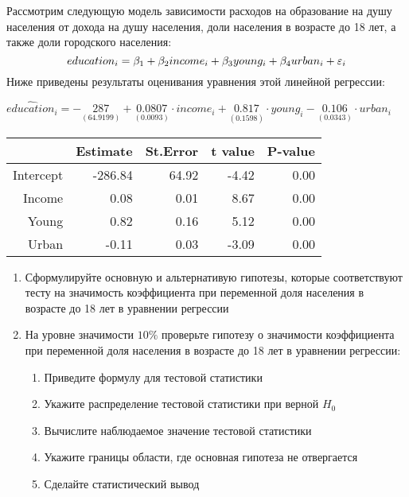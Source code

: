 \documentclass[pdftex,11pt,openany]{book}\usepackage[]{graphicx}\usepackage[]{color}
\begin{document}
\begin{problem}
 Рассмотрим следующую модель зависимости расходов на образование на душу населения от дохода на душу населения, доли населения в возрасте до 18 лет, а также доли городского населения: 
\[
education_i = \beta_1 + \beta_2 income_i + \beta_3 young_i + \beta_4 urban_i + \varepsilon_i
\]
Ниже приведены результаты оценивания уравнения этой линейной регрессии:
\begin{center}
\ensuremath{\widehat{education}_i=-\underset{(64.9199)}{287}+\underset{( 0.0093)}{0.0807}\cdot income_i+\underset{( 0.1598)}{0.817}\cdot young_i-\underset{( 0.0343)}{0.106}\cdot urban_i}%
\begin{table}[ht]
\centering
\begin{tabular}{rrrrr}
  \hline
 & Estimate & St.Error & t value & P-value \\ 
  \hline
Intercept & -286.84 & 64.92 & -4.42 & 0.00 \\ 
  Income & 0.08 & 0.01 & 8.67 & 0.00 \\ 
  Young & 0.82 & 0.16 & 5.12 & 0.00 \\ 
  Urban & -0.11 & 0.03 & -3.09 & 0.00 \\ 
   \hline
\end{tabular}
\end{table}

\end{center}

\begin{enumerate}
\item Сформулируйте основную и альтернативую гипотезы, которые соответствуют тесту на значимость коэффициента при переменной доля населения в возрасте до 18 лет в уравнении регрессии
\item На уровне значимости $10\%$ проверьте гипотезу о значимости коэффициента при переменной доля населения в возрасте до 18 лет в уравнении регрессии:
\begin{enumerate}
\item Приведите формулу для тестовой статистики
\item Укажите распределение тестовой статистики при верной $H_0$
\item Вычислите наблюдаемое значение тестовой статистики
\item Укажите границы области, где основная гипотеза не отвергается
\item Сделайте статистический вывод
\end{enumerate}



\end{enumerate}
\end{problem}
\end{document}

